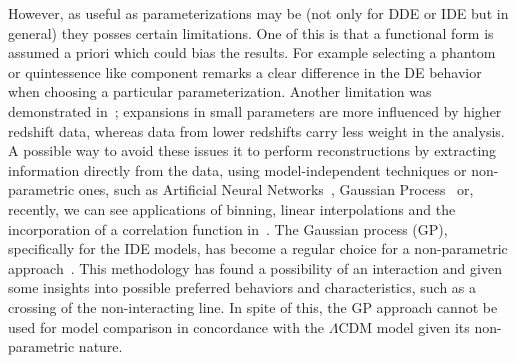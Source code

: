\documentclass[twocolumn,a4paper,reprint,amssymb,aps,prd,groupedaddress,superscriptaddress,nofootinbib]{revtex4-2}
\begin{document}
However, as useful as parameterizations may be (not only for DDE or IDE but in general) they
posses certain limitations. One of this is that a functional form is assumed a priori which could bias the results.
For example selecting a phantom or quintessence like component remarks a clear difference in the DE
behavior when choosing a particular parameterization. {Another limitation was demonstrated in~\cite{Colgain:2021pmf}; expansions in small parameters are more influenced by higher redshift data, whereas data from lower redshifts carry less weight in the analysis.} A possible way to avoid these issues it to perform reconstructions by extracting information directly
from the data,  using model-independent techniques or non-parametric ones, such as Artificial Neural
Networks~\cite{Wang:2019vxv, Gomez-Vargas:2021zyl, Benisty:2022psx}, Gaussian Process~\cite{Keeley:2020aym, Seikel2012,
Holsclaw2010, Liao:2019qoc, Liao:2020zko, Benisty:2020kdt, Benisty:2022psx, Calderon:2022cfj, Calderon:2023msm} or, recently, we can see applications of binning, linear interpolations and the incorporation
of a correlation function in~\cite{Escamilla:2021uoj}.
The Gaussian process (GP), specifically for the IDE models, has become a regular choice for a non-parametric
approach~\cite{Aljaf:2020eqh, Mukherjee:2021ggf, Yang:2015tzc, Bonilla:2021dql, Bonilla:2020wbn,
vonMarttens:2020apn}. This methodology has found a possibility of an interaction and given some insights
into possible preferred behaviors and characteristics, such as a crossing of the non-interacting line.
In spite of this, the GP approach cannot be used for model comparison in concordance with the $\Lambda$CDM
model given its non-parametric nature.
\end{document}
